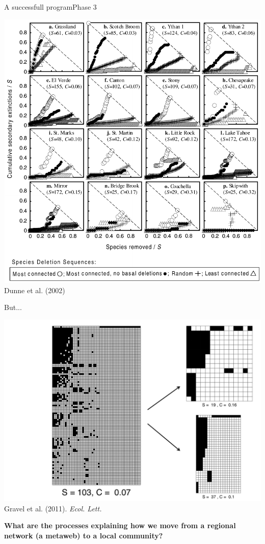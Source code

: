 \documentclass{eecslides}
\begin{document}
	\begin{frame}{A successfull program}{Phase 3}
		\begin{center}
		\includegraphics[height=0.65\textheight]{dunne}\\
		\footnotesize{Dunne et al. (2002)}\\
		\end{center}	
	\end{frame}


	\begin{frame}{But...}
		\begin{center}
			\includegraphics[height=0.55\textheight]{havens_sampling}\\
			\footnotesize{Gravel et al. (2011). \textit{Ecol. Lett.}}
		\end{center}   
		\begin{center}
			\alert{\textbf{What are the processes explaining how we move from a regional network (a metaweb) to a local community?}}
		\end{center}	 	    
	\end{frame}
\end{document}
